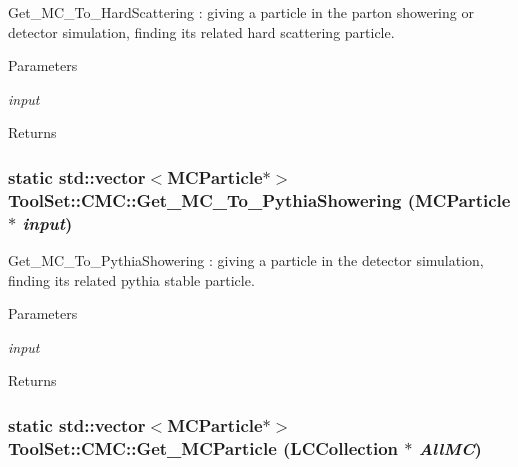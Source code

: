 Get\_\-MC\_\-To\_\-HardScattering : giving a particle in the parton showering or detector simulation, finding its related hard scattering particle. 
\begin{DoxyParams}{Parameters}
\item[{\em input}]\end{DoxyParams}
\begin{DoxyReturn}{Returns}

\end{DoxyReturn}
\hypertarget{classToolSet_1_1CMC_a90ef4f7069e375c606a3469d13ed3109}{
\subsubsection[{Get\_\-MC\_\-To\_\-PythiaShowering}]{\setlength{\rightskip}{0pt plus 5cm}static std::vector$<$MCParticle$\ast$$>$ ToolSet::CMC::Get\_\-MC\_\-To\_\-PythiaShowering (MCParticle $\ast$ {\em input})}}
\label{classToolSet_1_1CMC_a90ef4f7069e375c606a3469d13ed3109}


Get\_\-MC\_\-To\_\-PythiaShowering : giving a particle in the detector simulation, finding its related pythia stable particle. 
\begin{DoxyParams}{Parameters}
\item[{\em input}]\end{DoxyParams}
\begin{DoxyReturn}{Returns}

\end{DoxyReturn}
\hypertarget{classToolSet_1_1CMC_aec3000cf58c5ef65b62938decced8303}{
\subsubsection[{Get\_\-MCParticle}]{\setlength{\rightskip}{0pt plus 5cm}static std::vector$<$MCParticle$\ast$$>$ ToolSet::CMC::Get\_\-MCParticle (LCCollection $\ast$ {\em AllMC})}}
\label{classToolSet_1_1CMC_aec3000cf58c5ef65b62938decced8303}


